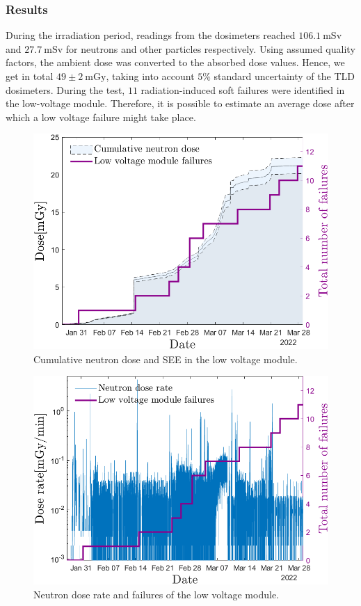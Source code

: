 \subsubsection{Results}
During the irradiation period, readings from the dosimeters reached $106.1\mathrm{\ mSv}$ and $27.7\mathrm{\ mSv}$ for neutrons and other particles respectively.
Using assumed quality factors, the ambient dose was converted to the absorbed dose values. Hence, we get in total $49\pm{2}\mathrm{\ mGy}$, taking into account $5$\% standard uncertainty of the TLD dosimeters. During the test, $11$ radiation-induced soft failures were identified in the low-voltage module. Therefore, it is possible to estimate an average dose after which a low voltage failure might take place.
\begin{figure}[!hbtp]
    \centering
    \includegraphics[width=0.6\columnwidth]{Chapter4/images/LV_failure_and_neutronsrate.png}
    \caption{Cumulative neutron dose and \gls{SEE} in the low voltage module.}
    \label{fig:lv_neutrons}
\end{figure}
\begin{figure}[!hbtp]
    \centering
    \includegraphics[width=0.6\columnwidth]{Chapter4/images/neutrons_dose_rate.png}
    \caption{Neutron dose rate and failures of the low voltage module.}
    \label{fig:lv_neutrons_rate}
\end{figure}


